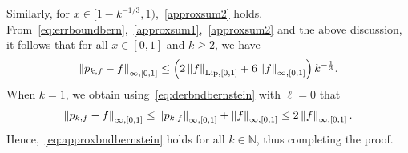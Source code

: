 \documentclass[a4paper,onecolumn,11pt,accepted=2026-05-12]{quantumarticle}
\newcommand{\norm}[1]{\left\Vert#1\right\Vert}
\newcommand{\NN}{\mathbb{N}}
\begin{document}
Similarly, for $x \in  [1-k^{-1/3},1)$,~\eqref{approxsum2} holds.
From~\eqref{eq:errboundbern},~\eqref{approxsum1},~\eqref{approxsum2} and the above discussion, it follows that for all $x \in [0,1]$ and $k \geq 2$, we have
\begin{align}
    \norm{p_{k,f}-f}_{\infty,[0,1]} \leq \left( 2\norm{f}_{\mathrm{Lip},[0,1]}+6\norm{f}_{\infty,[0,1]}\right) k^{-\frac 13}. \notag  
\end{align}
When $k=1$, we obtain using~\eqref{eq:derbndbernstein} with $\ell=0$ that
    \begin{align}
    \norm{p_{k,f}-f}_{\infty,[0,1]}  \leq \norm{p_{k,f}}_{\infty,[0,1]} +\norm{f}_{\infty,[0,1]} \leq 2\norm{f}_{\infty,[0,1]}. \notag  
\end{align}
Hence,~\eqref{eq:approxbndbernstein} holds for all $k \in \NN$,
     thus completing the proof.
\end{document}
